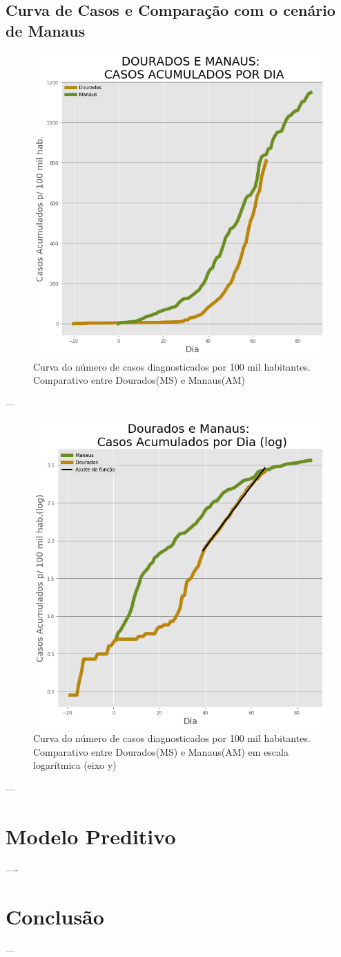 \documentclass[12pt]{article}
\begin{document}
\subsection{Curva de Casos e Comparação com o cenário de Manaus}\label{ssec:curvaMAU}

\begin{figure}[!htb]
  \centering
  \includegraphics[width=.6\textwidth]{figs/Dourados_Manaus_casos.png}
  \caption{Curva do número de casos diagnosticados por 100 mil habitantes. Comparativo entre Dourados(MS) e Manaus(AM)}
  \label{fig:curva100K}
  \end{figure}
---

\begin{figure}[!htb]
  \centering
  \includegraphics[width=.6\textwidth]{figs/Dourados_Manaus_casos_log.png}
  \caption{Curva do número de casos diagnosticados por 100 mil habitantes. Comparativo entre Dourados(MS) e Manaus(AM) em escala logarítmica (eixo y)}
  \label{fig:curva100KLog}
  \end{figure}

---


\section{Modelo Preditivo}

----

\section{Conclusão}\label{conc}

---



\end{document}
